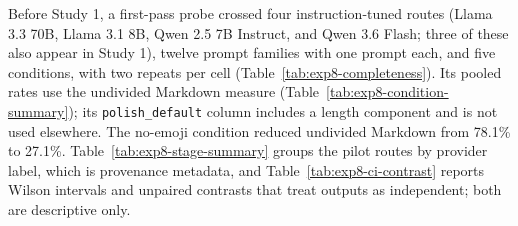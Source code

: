 \documentclass[acmsmall,screen,review,anonymous]{acmart}
\begin{document}
Before Study 1, a first-pass probe crossed four instruction-tuned routes (Llama 3.3 70B, Llama 3.1 8B, Qwen 2.5 7B Instruct, and Qwen 3.6 Flash; three of these also appear in Study 1), twelve prompt families with one prompt each, and five conditions, with two repeats per cell (Table~\ref{tab:exp8-completeness}). Its pooled rates use the undivided Markdown measure (Table~\ref{tab:exp8-condition-summary}); its \texttt{polish\_default} column includes a length component and is not used elsewhere. The no-emoji condition reduced undivided Markdown from 78.1\% to 27.1\%. Table~\ref{tab:exp8-stage-summary} groups the pilot routes by provider label, which is provenance metadata, and Table~\ref{tab:exp8-ci-contrast} reports Wilson intervals and unpaired contrasts that treat outputs as independent; both are descriptive only.








\end{document}
